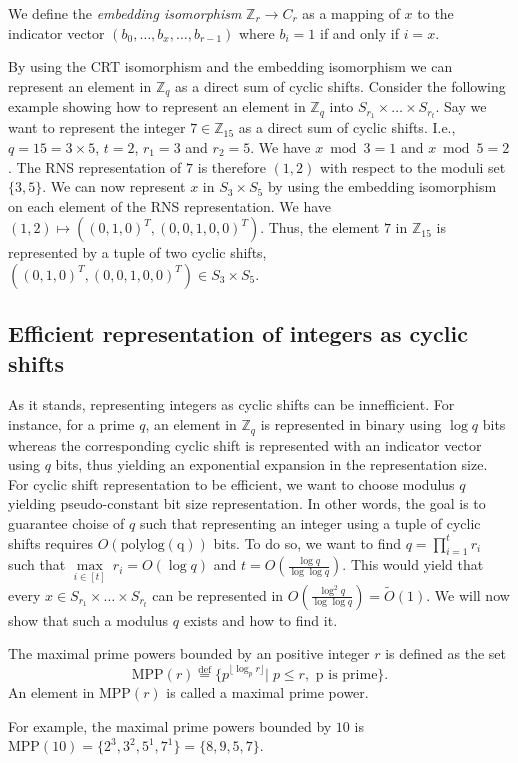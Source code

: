 \begin{definition}
    We define the \textit{embedding isomorphism} $\mathbb{Z}_r \rightarrow C_r$ as a mapping of $x$ to the indicator vector $(b_0, \dots, b_x, \dots, b_{r-1})$ where $b_i = 1$ if and only if $i = x$.
\end{definition}
By using the CRT isomorphism and the embedding isomorphism we can represent an element in $\mathbb{Z}_q$ as a direct sum of cyclic shifts.
Consider the following example showing how to represent an element in $\mathbb{Z}_q$ into $S_{r_1} \times \dots \times S_{r_t}$.
Say we want to represent the integer $7 \in \mathbb{Z}_{15}$ as a direct sum of cyclic shifts. I.e., $q = 15 = 3 \times 5$, $t = 2$, $r_1 = 3$ and $r_2 = 5$. We have $x \bmod 3 = 1$ and $x \bmod 5 = 2$. The RNS representation of $7$ is therefore $(1,2)$ with respect to the moduli set $\{3,5\}$. We can now represent $x$ in $S_3 \times S_5$ by using the embedding isomorphism on each element of the RNS representation. We have $(1,2) \mapsto ((0,1,0)^T, (0,0,1,0,0)^T)$. Thus, the element $7$ in $\mathbb{Z}_{15}$ is represented by a tuple of two cyclic shifts, $((0,1,0)^T, (0,0,1,0,0)^T) \in S_3 \times S_5$.

\subsection{Efficient representation of integers as cyclic shifts}
As it stands, representing integers as cyclic shifts can be innefficient. For instance, for a prime $q$, an element in $\mathbb{Z}_q$ is represented in binary using $\log q$ bits whereas the corresponding cyclic shift is represented with an indicator vector using $q$ bits, thus yielding an exponential expansion in the representation size. For cyclic shift representation to be efficient, we want to choose modulus $q$ yielding pseudo-constant bit size representation. In other words, the goal is to guarantee choise of $q$ such that representing an integer using a tuple of cyclic shifts requires $O(\operatorname{polylog(q)})$ bits. To do so, we want to find $q = \prod_{i=1}^t r_i$ such that $\underset{i \in [t]}{\max} \ r_i = O(\log q)$ and $t = O(\frac{\log q}{\log \log q})$. This would yield that every $x \in S_{r_1} \times \dots \times S_{r_t}$ can be represented in $O(\frac{\log^2q}{\log \log q}) = \tilde{O}(1)$. We will now show that such a modulus $q$ exists and how to find it.

\begin{definition}
    The maximal prime powers bounded by an positive integer $r$ is defined as the set
    \begin{equation*}
        \text{MPP}(r) \stackrel{\mathrm{def}}{=} \{p^{\lfloor \log_p r \rfloor} | \; p \leq r, \text{ p is prime}\}.
    \end{equation*}
    An element in $\text{MPP}(r)$ is called a maximal prime power.
\end{definition}
For example, the maximal prime powers bounded by $10$ is $\text{MPP}(10) = \{2^3, 3^2, 5^1, 7^1\} = \{8,9,5,7\}$.

